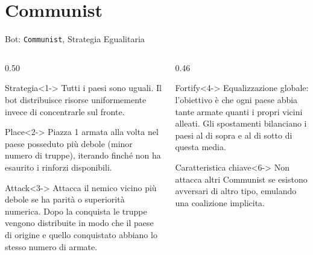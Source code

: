 \documentclass[9pt,serif,usenames,dvipsnames]{beamer}
\begin{document}
	\section{Communist}
	\begin{frame}{\centering Bot: \texttt{Communist}, Strategia Egualitaria}
		\begin{columns}[T]
			\begin{column}{0.50\textwidth}
				\begin{block}{Strategia}<1->
					\small
					\alert{Tutti i paesi sono uguali.} Il bot distribuisce risorse
					uniformemente invece di concentrarle sul fronte.
				\end{block}
				\vspace{0.24cm}
				\begin{block}{Place}<2->
					\small
					Piazza \alert{1 armata alla volta} nel paese posseduto più
					debole (minor numero di truppe), iterando finché non ha
					esaurito i rinforzi disponibili.
				\end{block}
				\vspace{0.24cm}
				\begin{block}{Attack}<3->
					\small
					Attacca il nemico vicino più debole se ha \alert{parità o
						superiorità numerica}. Dopo la conquista le truppe vengono
					distribuite in modo che il paese di origine e quello
					conquistato abbiano lo stesso numero di armate.
				\end{block}
			\end{column}
			\begin{column}{0.46\textwidth}
				\begin{block}{Fortify}<4->
					\small
					\alert{Equalizzazione globale}: l'obiettivo è che ogni paese
					abbia tante armate quanti i propri vicini alleati. Gli
					spostamenti bilanciano i paesi al di sopra e al di sotto
					di questa media.
				\end{block}
				\begin{alertblock}{Caratteristica chiave}<6->
					\small
					\alert{Non attacca altri Communist} se esistono avversari di
					altro tipo, emulando una coalizione implicita.
				\end{alertblock}
			\end{column}
		\end{columns}
	\end{frame}
\end{document}
